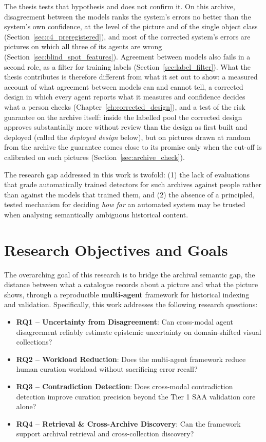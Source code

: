 \documentclass[12pt,a4paper]{report}
\begin{document}
The thesis tests that hypothesis and does not confirm it. On this archive, disagreement between the models ranks the system's errors no better than the system's own confidence, at the level of the picture and of the single object class (Section~\ref{sec:c4_preregistered}), and most of the corrected system's errors are pictures on which all three of its agents are wrong (Section~\ref{sec:blind_spot_features}). Agreement between models also fails in a second role, as a filter for training labels (Section~\ref{sec:label_filter}). What the thesis contributes is therefore different from what it set out to show: a measured account of what agreement between models can and cannot tell, a corrected design in which every agent reports what it measures and confidence decides what a person checks (Chapter~\ref{ch:corrected_design}), and a test of the risk guarantee on the archive itself: inside the labelled pool the corrected design approves substantially more without review than the design as first built and deployed (called the \emph{deployed design} below), but on pictures drawn at random from the archive the guarantee comes close to its promise only when the cut-off is calibrated on such pictures (Section~\ref{sec:archive_check}).

The research gap addressed in this work is twofold: (1) the lack of evaluations that grade automatically trained detectors for such archives against people rather than against the models that trained them, and (2) the absence of a principled, tested mechanism for deciding \textit{how far} an automated system may be trusted when analysing semantically ambiguous historical content.

\section{Research Objectives and Goals}
\label{sec:objectives}
The overarching goal of this research is to bridge the archival semantic gap, the distance between what a catalogue records about a picture and what the picture shows, through a reproducible \textbf{multi-agent} framework for historical indexing and validation. Specifically, this work addresses the following research questions:
\begin{itemize}
    \item \textbf{RQ1 -- Uncertainty from Disagreement}: Can cross-modal agent disagreement reliably estimate epistemic uncertainty on domain-shifted visual collections?
    \item \textbf{RQ2 -- Workload Reduction}: Does the multi-agent framework reduce human curation workload without sacrificing error recall?
    \item \textbf{RQ3 -- Contradiction Detection}: Does cross-modal contradiction detection improve curation precision beyond the Tier 1 SAA validation core alone?
    \item \textbf{RQ4 -- Retrieval \& Cross-Archive Discovery}: Can the framework support archival retrieval and cross-collection discovery?
\end{itemize}
\end{document}
